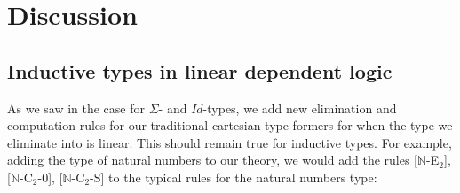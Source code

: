   \section{Discussion}\label{discussion}
  \subsection{Inductive types in linear dependent logic}
  As we saw in the case for $\Sigma$- and $Id$-types, we add new elimination and computation rules for our traditional cartesian type formers for when the type we eliminate into is linear. This should remain true for inductive types. For example, adding the type of natural numbers to our theory, we would add the rules [$\mathbb{N}$-E$_2$], [$\mathbb{N}$-C$_2$-0], [$\mathbb{N}$-C$_2$-S] to the typical rules for the natural numbers type:\\
